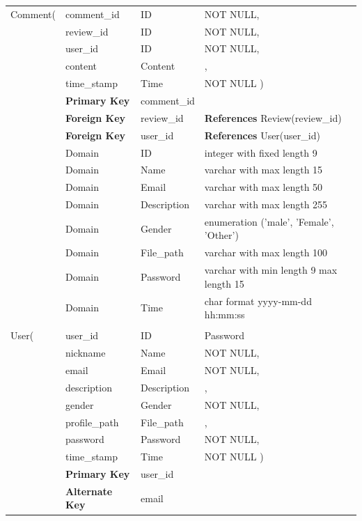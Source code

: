 \documentclass[12pt]{article}
\begin{document}
\begin{table}[H]
\begin{tabular}{l l l l}
        \\Comment(
        & comment\_id & ID & NOT NULL,\\
        & review\_id & ID & NOT NULL,\\
        & user\_id & ID & NOT NULL,\\
        & content & Content &,\\
        & time\_stamp & Time & NOT NULL
        \hspace{4PT} )\\
        &\textbf{Primary Key}& comment\_id&\\
        &\textbf{Foreign Key}& review\_id &\textbf{References} Review(review\_id)\\
        &\textbf{Foreign Key}& user\_id&\textbf{References} User(user\_id)\\
		\hline
		&Domain & ID & integer with fixed length 9\\
		&Domain & Name & varchar with max length 15\\
		&Domain & Email & varchar with max length 50\\
		&Domain & Description & varchar with max length 255\\
        &Domain & Gender & enumeration ('male', 'Female', 'Other')\\
        &Domain & File\_path& varchar with max length 100\\
        &Domain & Password & varchar with min length 9 max length 15\\
        &Domain & Time  & char format yyyy-mm-dd hh:mm:ss\\

        \\User(& user\_id&ID&Password
        \\&nickname&Name&NOT NULL,
        \\&email&Email& NOT NULL,
        \\&description&Description&,
        \\&gender&Gender&NOT NULL,
        \\&profile\_path&File\_path&,
        \\&password&Password&NOT NULL,
        \\& time\_stamp & Time & NOT NULL
        \hspace{4PT} )\\
        &\textbf{Primary Key}& user\_id&\\
        &\textbf{Alternate Key}& email&\\
        \hline
	\end{tabular}
\end{table}\newpage
\end{document}
